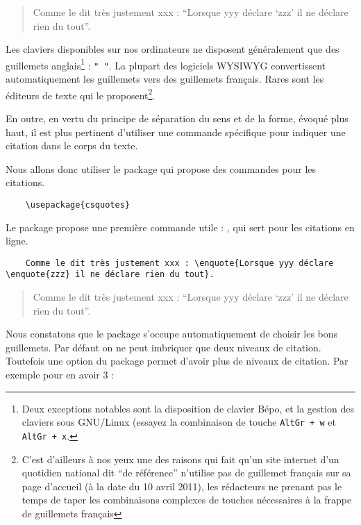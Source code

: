 \begin{quotation}
	Comme le dit très justement xxx : \enquote{Lorsque yyy déclare \enquote{zzz} il ne déclare rien du tout}.
\end{quotation}

Les claviers disponibles sur nos ordinateurs ne disposent généralement que des guillemets anglais\footnote{Deux exceptions notables sont la disposition de clavier Bépo, et la gestion des claviers sous GNU/Linux (essayez la combinaison de touche \texttt{AltGr + w} et \texttt{AltGr + x}.} : \verb|" "|. 
La plupart des logiciels WYSIWYG convertissent automatiquement les guillemets vers des guillemets français. Rares sont les éditeurs de texte qui le proposent\footnote{C'est d'ailleurs à nos yeux une des raisons qui fait qu'un site internet d'un quotidien national dit \enquote{de référence} n'utilise pas de guillemet français sur sa page d'accueil (à la date du 10 avril 2011), les rédacteurs ne prenant pas le temps de taper les combinaisons complexes de touches nécessaires à la frappe de guillemets français}. 

En outre, en vertu du principe de séparation du sens et de la forme, évoqué plus haut, il est plus pertinent d'utiliser une commande spécifique pour indiquer une citation dans le corps du texte.

Nous allons donc utiliser le package  qui propose des commandes  pour les citations.

\begin{verbatim}
	\usepackage{csquotes}
\end{verbatim}

Le package propose une première commande utile : , qui sert pour les citations en ligne.

\begin{verbatim}
	Comme le dit très justement xxx : \enquote{Lorsque yyy déclare \enquote{zzz} il ne déclare rien du tout}.
\end{verbatim}


\begin{quotation}
	Comme le dit très justement xxx : \enquote{Lorsque yyy déclare \enquote{zzz} il ne déclare rien du tout}.
\end{quotation}


Nous constatons que le package s'occupe automatiquement de choisir les bons guillemets. Par défaut on ne peut imbriquer que deux niveaux de citation. Toutefois une option du package permet d'avoir plus de niveaux de citation. Par exemple pour en avoir 3 : 

